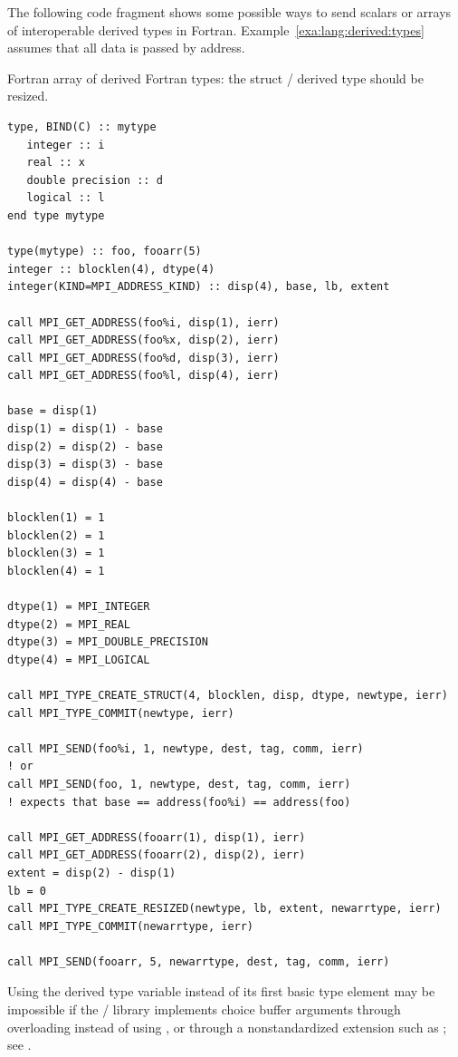 The following code fragment shows
some possible ways to send scalars or arrays of interoperable
derived types in Fortran. Example~\ref{exa:lang:derived:types} assumes that all data is passed by address.
\begin{example}
Fortran array of derived Fortran types: the struct \MPI/ derived type should be resized.
\label{exa:lang:derived:types}
\begin{lstlisting}[language={[MPI]Fortran}]
type, BIND(C) :: mytype
   integer :: i
   real :: x
   double precision :: d
   logical :: l
end type mytype

type(mytype) :: foo, fooarr(5)
integer :: blocklen(4), dtype(4)
integer(KIND=MPI_ADDRESS_KIND) :: disp(4), base, lb, extent

call MPI_GET_ADDRESS(foo%i, disp(1), ierr)
call MPI_GET_ADDRESS(foo%x, disp(2), ierr)
call MPI_GET_ADDRESS(foo%d, disp(3), ierr)
call MPI_GET_ADDRESS(foo%l, disp(4), ierr)

base = disp(1)
disp(1) = disp(1) - base
disp(2) = disp(2) - base
disp(3) = disp(3) - base
disp(4) = disp(4) - base

blocklen(1) = 1
blocklen(2) = 1
blocklen(3) = 1
blocklen(4) = 1

dtype(1) = MPI_INTEGER
dtype(2) = MPI_REAL
dtype(3) = MPI_DOUBLE_PRECISION
dtype(4) = MPI_LOGICAL

call MPI_TYPE_CREATE_STRUCT(4, blocklen, disp, dtype, newtype, ierr)
call MPI_TYPE_COMMIT(newtype, ierr)

call MPI_SEND(foo%i, 1, newtype, dest, tag, comm, ierr)
! or
call MPI_SEND(foo, 1, newtype, dest, tag, comm, ierr)
! expects that base == address(foo%i) == address(foo)

call MPI_GET_ADDRESS(fooarr(1), disp(1), ierr)
call MPI_GET_ADDRESS(fooarr(2), disp(2), ierr)
extent = disp(2) - disp(1)
lb = 0
call MPI_TYPE_CREATE_RESIZED(newtype, lb, extent, newarrtype, ierr)
call MPI_TYPE_COMMIT(newarrtype, ierr)

call MPI_SEND(fooarr, 5, newarrtype, dest, tag, comm, ierr)
\end{lstlisting}
\end{example}

Using the derived type variable  instead of its
first basic type element  may be impossible
if the \MPI/ library implements choice buffer arguments
through overloading instead of using
, or through a
nonstandardized extension such as ;
see
.

